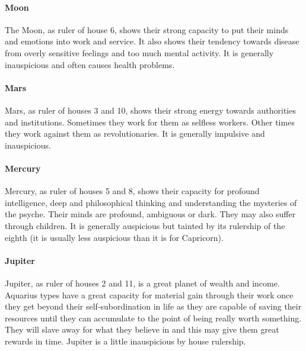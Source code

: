  

\paragraph{Moon}

The Moon, as ruler of house 6, shows their strong capacity to put their minds and emotions into work and service. It also shows their tendency towards disease from overly sensitive feelings and too much mental activity. It is generally inauspicious and often causes health problems.

 

\paragraph{Mars}

Mars, as ruler of houses 3 and 10, shows their strong energy towards authorities and institutions. Sometimes they work for them as selfless workers. Other times they work against them as revolutionaries. It is generally impulsive and inauspicious.

 

\paragraph{Mercury}

Mercury, as ruler of houses 5 and 8, shows their capacity for profound intelligence, deep and philosophical thinking and understanding the mysteries of the psyche. Their minds are profound, ambiguous or dark. They may also suffer through children. It is generally auspicious but tainted by its rulership of the eighth (it is usually less auspicious than it is for Capricorn).

 

\paragraph{Jupiter}

Jupiter, as ruler of houses 2 and 11, is a great planet of wealth and income. Aquarius types have a great capacity for material gain through their work once they get beyond their self‑subordination in life as they are capable of saving their resources until they can accumulate to the point of being really worth something. They will slave away for what they believe in and this may give them great rewards in time. Jupiter is a little inauspicious by house rulership.

 


